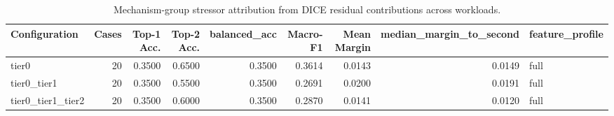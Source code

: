\begin{table}[t]
\centering
\caption{Mechanism-group stressor attribution from DICE residual contributions across workloads.}
\label{tab:dice_stressor_diagnosis}
\footnotesize
\begin{tabular}{lrrrrrrrl}
\toprule
Configuration & Cases & Top-1 Acc. & Top-2 Acc. & balanced_acc & Macro-F1 & Mean Margin & median_margin_to_second & feature_profile \\
\midrule
tier0 & 20 & 0.3500 & 0.6500 & 0.3500 & 0.3614 & 0.0143 & 0.0149 & full \\
tier0_tier1 & 20 & 0.3500 & 0.5500 & 0.3500 & 0.2691 & 0.0200 & 0.0191 & full \\
tier0_tier1_tier2 & 20 & 0.3500 & 0.6000 & 0.3500 & 0.2870 & 0.0141 & 0.0120 & full \\
\bottomrule
\end{tabular}

\end{table}
